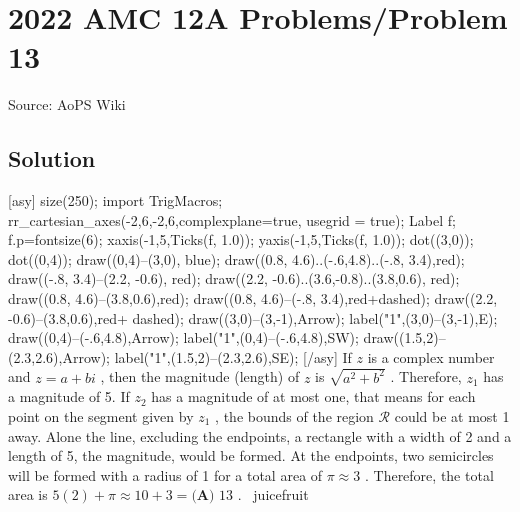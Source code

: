 \documentclass[12pt]{article}
\begin{document}
\section*{{2022 AMC 12A Problems/Problem 13}}
Source: AoPS Wiki

\subsection*{Solution}
[asy] size(250); import TrigMacros; rr_cartesian_axes(-2,6,-2,6,complexplane=true, usegrid = true); Label f; f.p=fontsize(6); xaxis(-1,5,Ticks(f, 1.0)); yaxis(-1,5,Ticks(f, 1.0)); dot((3,0)); dot((0,4)); draw((0,4)--(3,0), blue); draw((0.8, 4.6)..(-.6,4.8)..(-.8, 3.4),red); draw((-.8, 3.4)--(2.2, -0.6), red); draw((2.2, -0.6)..(3.6,-0.8)..(3.8,0.6), red); draw((0.8, 4.6)--(3.8,0.6),red); draw((0.8, 4.6)--(-.8, 3.4),red+dashed); draw((2.2, -0.6)--(3.8,0.6),red+ dashed); draw((3,0)--(3,-1),Arrow); label("1",(3,0)--(3,-1),E); draw((0,4)--(-.6,4.8),Arrow); label("1",(0,4)--(-.6,4.8),SW); draw((1.5,2)--(2.3,2.6),Arrow); label("1",(1.5,2)--(2.3,2.6),SE); [/asy] If $z$ is a complex number and $z = a + bi$ , then the magnitude (length) of $z$ is $\sqrt{a^2 + b^2}$ . Therefore, $z_1$ has a magnitude of 5. If $z_2$ has a magnitude of at most one, that means for each point on the segment given by $z_1$ , the bounds of the region $\mathcal{R}$ could be at most 1 away. Alone the line, excluding the endpoints, a rectangle with a width of 2 and a length of 5, the magnitude, would be formed. At the endpoints, two semicircles will be formed with a radius of 1 for a total area of $\pi \approx 3$ .
Therefore, the total area is $5(2) + \pi \approx 10 + 3 = \boxed{\textbf{(A) } 13}$ . ~juicefruit
\end{document}
